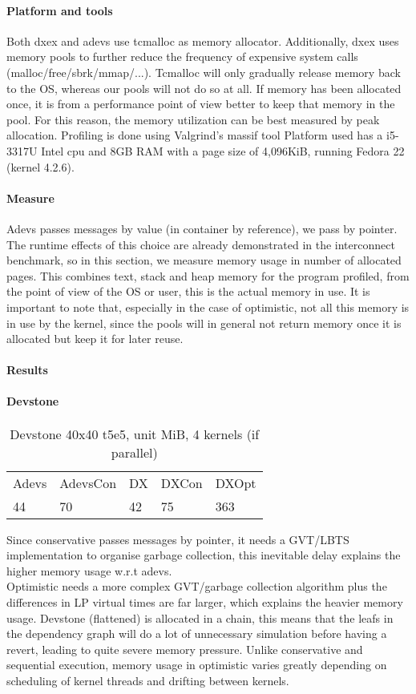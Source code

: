 \paragraph*{Platform and tools}
Both dxex and adevs use tcmalloc as memory allocator. Additionally, dxex uses memory pools to further reduce the frequency of expensive system calls (malloc/free/sbrk/mmap/...). Tcmalloc will only gradually release memory back to the OS, whereas our pools will not do so at all. If memory has been allocated once, it is from a performance point of view better to keep that memory in the pool. For this reason, the memory utilization can be best measured by peak allocation. Profiling is done using Valgrind's massif tool \cite{Nethercote:2007:VFH:1273442.1250746}
Platform used has a i5-3317U Intel cpu and 8GB RAM with a page size of 4,096KiB, running Fedora 22 (kernel 4.2.6).\\
\paragraph*{Measure}
Adevs passes messages by value (in container by reference), we pass by pointer. The runtime effects of this choice are already demonstrated in the interconnect benchmark, so in this section, we measure memory usage in number of allocated pages. This combines text, stack and heap memory for the program profiled, from the point of view of the OS or user, this is the actual memory in use. It is important to note that, especially in the case of optimistic, not all this memory is in use by the kernel, since the pools will in general not return memory once it is allocated but keep it for later reuse.
\paragraph*{Results}
\paragraph*{Devstone}
\begin{table}[lhtb]
	\centering
	\caption{Devstone 40x40 t5e5, unit MiB, 4 kernels (if parallel)}
	\label{dtone_mem}
	\begin{tabular}{lllll}
		Adevs & AdevsCon &DX &DXCon &DXOpt\\
		44 & 70 & 42 & 75 & 363  \\
	\end{tabular}
\end{table}
Since conservative passes messages by pointer, it needs a GVT/LBTS implementation to organise garbage collection, this inevitable delay explains the higher memory usage w.r.t adevs.\\
Optimistic needs a more complex GVT/garbage collection algorithm plus the differences in LP virtual times are far larger, which explains the heavier memory usage. Devstone (flattened) is allocated in a chain, this means that the leafs in the dependency graph will do a lot of unnecessary simulation before having a revert, leading to quite severe memory pressure. Unlike conservative and sequential execution, memory usage in optimistic varies greatly depending on scheduling of kernel threads and drifting between kernels. 
